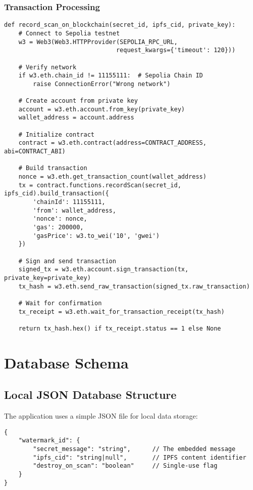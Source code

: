 \documentclass[12pt,a4paper]{article}
\begin{document}
\subsubsection{Transaction Processing}

\begin{lstlisting}[caption=Blockchain Transaction Processing]
def record_scan_on_blockchain(secret_id, ipfs_cid, private_key):
    # Connect to Sepolia testnet
    w3 = Web3(Web3.HTTPProvider(SEPOLIA_RPC_URL, 
                               request_kwargs={'timeout': 120}))
    
    # Verify network
    if w3.eth.chain_id != 11155111:  # Sepolia Chain ID
        raise ConnectionError("Wrong network")
    
    # Create account from private key
    account = w3.eth.account.from_key(private_key)
    wallet_address = account.address
    
    # Initialize contract
    contract = w3.eth.contract(address=CONTRACT_ADDRESS, abi=CONTRACT_ABI)
    
    # Build transaction
    nonce = w3.eth.get_transaction_count(wallet_address)
    tx = contract.functions.recordScan(secret_id, ipfs_cid).build_transaction({
        'chainId': 11155111,
        'from': wallet_address,
        'nonce': nonce,
        'gas': 200000,
        'gasPrice': w3.to_wei('10', 'gwei')
    })
    
    # Sign and send transaction
    signed_tx = w3.eth.account.sign_transaction(tx, private_key=private_key)
    tx_hash = w3.eth.send_raw_transaction(signed_tx.raw_transaction)
    
    # Wait for confirmation
    tx_receipt = w3.eth.wait_for_transaction_receipt(tx_hash)
    
    return tx_hash.hex() if tx_receipt.status == 1 else None
\end{lstlisting}

\section{Database Schema}

\subsection{Local JSON Database Structure}

The application uses a simple JSON file for local data storage:

\begin{lstlisting}[caption=Database Schema]
{
    "watermark_id": {
        "secret_message": "string",      // The embedded message
        "ipfs_cid": "string|null",       // IPFS content identifier
        "destroy_on_scan": "boolean"     // Single-use flag
    }
}
\end{lstlisting}
\end{document}

